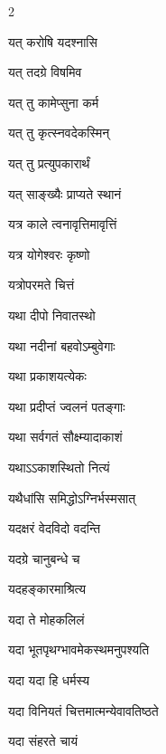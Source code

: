 \begin{multicols}{2}
\begin{indexlist}
\item यत् करोषि यदश्नासि \dotfill {}
\item यत् तदग्रे विषमिव \dotfill {}
\item यत् तु कामेप्सुना कर्म \dotfill {}
\item यत् तु कृत्स्नवदेकस्मिन् \dotfill {}
\item यत् तु प्रत्युपकारार्थं \dotfill {}
\item यत् साङ्ख्यैः प्राप्यते स्थानं \dotfill {}
\item यत्र काले त्वनावृत्तिमावृत्तिं \dotfill {}
\item यत्र योगेश्वरः कृष्णो \dotfill {}
\item यत्रोपरमते चित्तं \dotfill {}
\item यथा दीपो निवातस्थो \dotfill {}
\item यथा नदीनां बहवोऽम्बुवेगाः \dotfill {}
\item यथा प्रकाशयत्येकः \dotfill {}
\item यथा प्रदीप्तं ज्वलनं पतङ्गाः \dotfill {}
\item यथा सर्वगतं सौक्ष्म्यादाकाशं \dotfill {}
\item यथाऽऽकाशस्थितो नित्यं \dotfill {}
\item यथैधांसि समिद्धोऽग्निर्भस्मसात् \dotfill {}
\item यदक्षरं वेदविदो वदन्ति \dotfill {}
\item यदग्रे चानुबन्धे च \dotfill {}
\item यदहङ्कारमाश्रित्य \dotfill {}
\item यदा ते मोहकलिलं \dotfill {}
\item यदा भूतपृथग्भावमेकस्थमनुपश्यति \dotfill {}
\item यदा यदा हि धर्मस्य \dotfill {}
\item यदा विनियतं चित्तमात्मन्येवावतिष्ठते \dotfill {}
\item यदा संहरते चायं \dotfill {}

\end{indexlist}
\end{multicols}
